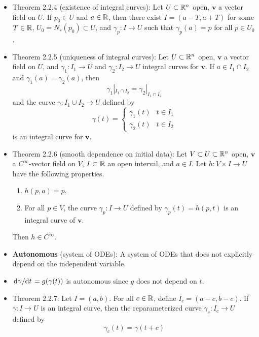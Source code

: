 \documentclass[../notes.tex]{subfiles}
\begin{document}
\begin{itemize}
\begin{itemize}
    \end{itemize}
    \item Theorem 2.2.4 (existence of integral curves): Let $U\subset\mathbb{R}^n$ open, $\bm{v}$ a vector field on $U$. If $p_0\in U$ and $a\in\mathbb{R}$, then there exist $I=(a-T,a+T)$ for some $T\in\mathbb{R}$, $U_0=N_r(p_0)\subset U$, and $\gamma_p:I\to U$ such that $\gamma_p(a)=p$ for all $p\in U_0$.
    \item Theorem 2.2.5 (uniqueness of integral curves): Let $U\subset\mathbb{R}^n$ open, $\bm{v}$ a vector field on $U$, and $\gamma_1:I_1\to U$ and $\gamma_2:I_2\to U$ integral curves for $\bm{v}$. If $a\in I_1\cap I_2$ and $\gamma_1(a)=\gamma_2(a)$, then
    \begin{equation*}
        \gamma_1|_{I_1\cap I_2} = \gamma_2|_{I_1\cap I_2}
    \end{equation*}
    and the curve $\gamma:I_1\cup I_2\to U$ defined by
    \begin{equation*}
        \gamma(t) =
        \begin{cases}
            \gamma_1(t) & t\in I_1\\
            \gamma_2(t) & t\in I_2
        \end{cases}
    \end{equation*}
    is an integral curve for $\bm{v}$.
    \item Theorem 2.2.6 (smooth dependence on initial data): Let $V\subset U\subset\mathbb{R}^n$ open, $\bm{v}$ a $C^\infty$-vector field on $V$, $I\subset\mathbb{R}$ an open interval, and $a\in I$. Let $h:V\times I\to U$ have the following properties.
    \begin{enumerate}
        \item $h(p,a)=p$.
        \item For all $p\in V$, the curve $\gamma_p:I\to U$ defined by $\gamma_p(t)=h(p,t)$ is an integral curve of $\bm{v}$.
    \end{enumerate}
    Then $h\in C^\infty$.
    \item \textbf{Autonomous} (system of ODEs): A system of ODEs that does not explicitly depend on the independent variable.
    \item $\dv*{\gamma}{t}=g(\gamma(t))$ is autonomous since $g$ does not depend on $t$.
    \item Theorem 2.2.7: Let $I=(a,b)$. For all $c\in\mathbb{R}$, define $I_c=(a-c,b-c)$. If $\gamma:I\to U$ is an integral curve, then the reparameterized curve $\gamma_c:I_c\to U$ defined by
    \begin{equation*}
        \gamma_c(t) = \gamma(t+c)
    \end{equation*}

\end{itemize}
\end{document}
